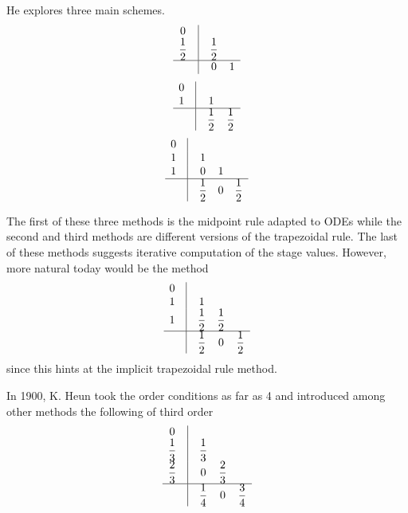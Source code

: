 \documentclass[a4paper,oneside]{book}
\numberwithin{equation}{chapter}
\begin{document}
He explores three main schemes.
\begin{align}
\begin{array}{*{20}{c}}
0&\vline& {}&{}\\
{\dfrac{1}{2}}&\vline& {\dfrac{1}{2}}&{}\\
\hline
{}&\vline& 0&1
\end{array}
\end{align}
\begin{align}
\begin{array}{*{20}{c}}
0&\vline& {}&{}\\
1&\vline& 1&{}\\
\hline
{}&\vline& {\dfrac{1}{2}}&{\dfrac{1}{2}}
\end{array}
\end{align}
\begin{align}
\begin{array}{*{20}{c}}
0&\vline& {}&{}&{}\\
1&\vline& 1&{}&{}\\
1&\vline& 0&1&{}\\
\hline
{}&\vline& {\dfrac{1}{2}}&0&{\dfrac{1}{2}}
\end{array}
\end{align}

The first of these three methods is the midpoint rule adapted to ODEs while the second and third methods are different versions of the trapezoidal rule. The last of these methods suggests iterative computation of the stage values. However, more natural today would be the method
\begin{align}
\begin{array}{*{20}{c}}
0&\vline& {}&{}&{}\\
1&\vline& 1&{}&{}\\
1&\vline& {\dfrac{1}{2}}&{\dfrac{1}{2}}&{}\\
\hline
{}&\vline& {\dfrac{1}{2}}&0&{\dfrac{1}{2}}
\end{array}
\end{align}
since this hints at the implicit trapezoidal rule method.

In 1900, K. Heun took the order conditions as far as 4 and introduced among other methods the following of third order
\begin{align}
\begin{array}{*{20}{c}}
0&\vline& {}&{}&{}\\
{\dfrac{1}{3}}&\vline& {\dfrac{1}{3}}&{}&{}\\
{\dfrac{2}{3}}&\vline& 0&{\dfrac{2}{3}}&{}\\
\hline
{}&\vline& {\dfrac{1}{4}}&0&{\dfrac{3}{4}}
\end{array}
\end{align}
\end{document}
